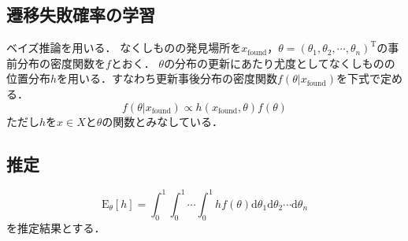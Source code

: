 \subsection{遷移失敗確率の学習} \label{ss:faultprob}
ベイズ推論を用いる．
なくしものの発見場所を$ x_{\mathrm{found}} $，$ \theta = (\theta_1 , \theta_2 , \cdots , \theta_n)^\mathrm{T} $の事前分布の密度関数を$ f $とおく．
$ \theta $の分布の更新にあたり尤度としてなくしものの位置分布$ h $を用いる．すなわち更新事後分布の密度関数$ f(\theta | x_{\mathrm{found}}) $を下式で定める．
\begin{equation} \label{eq:new_f}
    f(\theta | x_{\mathrm{found}}) \propto h(x_{\mathrm{found}} , \theta) f(\theta)
\end{equation}
ただし$ h $を$ x \in X $と$ \theta $の関数とみなしている．

\subsection{推定}
\begin{equation} \label{eq:exp}
    \mathrm{E}_\theta [h] = \int_{0}^{1} \int_{0}^{1} \cdots \int_{0}^{1} h f(\theta) \mathrm{d}\theta_1 \mathrm{d}\theta_2 \cdots \mathrm{d}\theta_n
\end{equation}
を推定結果とする．
